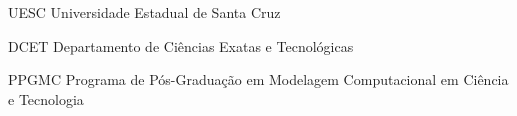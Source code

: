 %
%

\begin{siglas}
	\item[UESC] Universidade Estadual de Santa Cruz
	\item[DCET] Departamento de Ciências Exatas e Tecnológicas
	\item[PPGMC] Programa de Pós-Graduação em Modelagem Computacional em Ciência e Tecnologia
\end{siglas}
